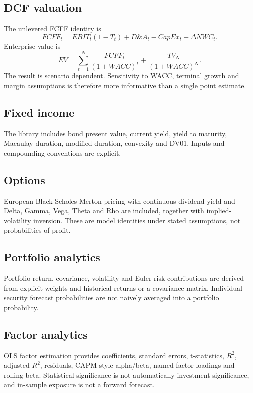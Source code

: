 \documentclass[11pt]{article}
\begin{document}
\subsection{DCF valuation}
The unlevered FCFF identity is
\begin{equation}
FCFF_t=EBIT_t(1-T_t)+D\&A_t-CapEx_t-\Delta NWC_t.
\end{equation}
Enterprise value is
\begin{equation}
EV=\sum_{t=1}^{N}\frac{FCFF_t}{(1+WACC)^t}+\frac{TV_N}{(1+WACC)^N}.
\end{equation}
The result is scenario dependent. Sensitivity to WACC, terminal growth and margin assumptions is therefore more informative than a single point estimate.

\subsection{Fixed income}
The library includes bond present value, current yield, yield to maturity, Macaulay duration, modified duration, convexity and DV01. Inputs and compounding conventions are explicit.

\subsection{Options}
European Black-Scholes-Merton pricing with continuous dividend yield and Delta, Gamma, Vega, Theta and Rho are included, together with implied-volatility inversion. These are model identities under stated assumptions, not probabilities of profit.

\subsection{Portfolio analytics}
Portfolio return, covariance, volatility and Euler risk contributions are derived from explicit weights and historical returns or a covariance matrix. Individual security forecast probabilities are not naively averaged into a portfolio probability.

\subsection{Factor analytics}
OLS factor estimation provides coefficients, standard errors, t-statistics, $R^2$, adjusted $R^2$, residuals, CAPM-style alpha/beta, named factor loadings and rolling beta. Statistical significance is not automatically investment significance, and in-sample exposure is not a forward forecast.
\end{document}
